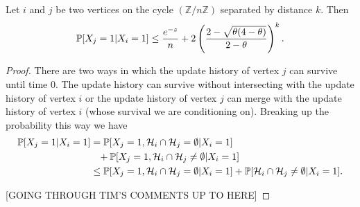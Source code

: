 	\begin{lemma}
		\label{lem:X_i+k given X_i}
		Let $i$ and $j$ be two vertices on the cycle $(\mathbb{Z}/n\mathbb{Z})$ separated by distance $k$. Then
		\begin{equation}
			\label{eq:prob X_i+k = 1|X_i = 1}
			\mathbb{P}[X_j = 1| X_i = 1] \leq \frac{e^{-z}}{n} + 2\left(\frac{2 - \sqrt{\theta(4 - \theta)}}{2 - \theta}\right)^k.
		\end{equation}
	\end{lemma}
	\begin{proof}
		There are two ways in which the update history of vertex $j$ can survive until time $0$. The update history can survive without intersecting with the update history of vertex $i$ or the update history of vertex $j$ can merge with the update history of vertex $i$ (whose survival we are conditioning on). %
		Breaking up the probability this way we have
		\begin{align}
			\prob[X_j = 1| X_i = 1] &= \prob[X_j = 1, \mathcal{H}_i \cap \mathcal{H}_j = \emptyset | X_i = 1] \notag\\
			&\phantom{=}+ \prob[X_j = 1, \mathcal{H}_i \cap \mathcal{H}_j \neq \emptyset | X_i = 1]\\
			&\leq \prob[X_j = 1, \mathcal{H}_i \cap \mathcal{H}_j = \emptyset | X_i = 1] %
			+ \prob[\mathcal{H}_i \cap \mathcal{H}_j \neq \emptyset | X_i = 1].
		\end{align}

		[GOING THROUGH TIM'S COMMENTS UP TO HERE]


\end{proof}
